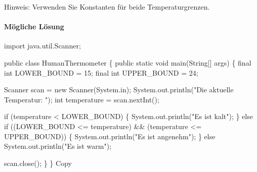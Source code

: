 \documentclass[
]{article}
\newenvironment{Shaded}{}{}
\newcommand{\NormalTok}[1]{#1}
\begin{document}
Hinweis: Verwenden Sie Konstanten für beide Temperaturgrenzen.

\paragraph{Mögliche Lösung}\label{muxf6gliche-luxf6sung-2}

\begin{Shaded}
\begin{Highlighting}[]
\NormalTok{import java.util.Scanner;}

\NormalTok{public class HumanThermometer \{}
\NormalTok{    public static void main(String[] args) \{}
\NormalTok{        final int LOWER\_BOUND = 15;}
\NormalTok{        final int UPPER\_BOUND = 24;}
        
\NormalTok{        Scanner scan = new Scanner(System.in);}
\NormalTok{        System.out.println("Die aktuelle Temperatur: ");}
\NormalTok{        int temperature = scan.nextInt();}
        
\NormalTok{        if (temperature \textless{} LOWER\_BOUND) \{}
\NormalTok{            System.out.println("Es ist kalt");}
\NormalTok{        \} }
\NormalTok{        else if ((LOWER\_BOUND \textless{}= temperature) \&\& (temperature \textless{}= UPPER\_BOUND)) \{}
\NormalTok{            System.out.println("Es ist angenehm");}
\NormalTok{        \} }
\NormalTok{        else}
\NormalTok{            System.out.println("Es ist warm");}
        
\NormalTok{        scan.close();}
\NormalTok{    \}}
\NormalTok{\}}
\NormalTok{Copy}
\end{Highlighting}
\end{Shaded}
\end{document}
